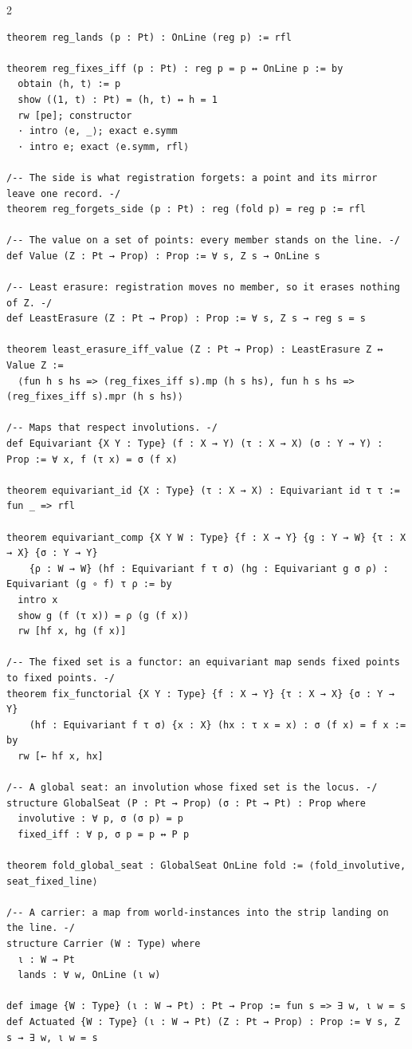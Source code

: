 \documentclass[10pt]{article}
\begin{document}
\begin{multicols}{2}
\begin{Verbatim}[fontsize=\fontsize{6.0}{6.9}\selectfont,breaklines,breakanywhere,breaksymbolleft={}]
theorem reg_lands (p : Pt) : OnLine (reg p) := rfl

theorem reg_fixes_iff (p : Pt) : reg p = p ↔ OnLine p := by
  obtain ⟨h, t⟩ := p
  show ((1, t) : Pt) = (h, t) ↔ h = 1
  rw [pe]; constructor
  · intro ⟨e, _⟩; exact e.symm
  · intro e; exact ⟨e.symm, rfl⟩

/-- The side is what registration forgets: a point and its mirror leave one record. -/
theorem reg_forgets_side (p : Pt) : reg (fold p) = reg p := rfl

/-- The value on a set of points: every member stands on the line. -/
def Value (Z : Pt → Prop) : Prop := ∀ s, Z s → OnLine s

/-- Least erasure: registration moves no member, so it erases nothing of Z. -/
def LeastErasure (Z : Pt → Prop) : Prop := ∀ s, Z s → reg s = s

theorem least_erasure_iff_value (Z : Pt → Prop) : LeastErasure Z ↔ Value Z :=
  ⟨fun h s hs => (reg_fixes_iff s).mp (h s hs), fun h s hs => (reg_fixes_iff s).mpr (h s hs)⟩

/-- Maps that respect involutions. -/
def Equivariant {X Y : Type} (f : X → Y) (τ : X → X) (σ : Y → Y) : Prop := ∀ x, f (τ x) = σ (f x)

theorem equivariant_id {X : Type} (τ : X → X) : Equivariant id τ τ := fun _ => rfl

theorem equivariant_comp {X Y W : Type} {f : X → Y} {g : Y → W} {τ : X → X} {σ : Y → Y}
    {ρ : W → W} (hf : Equivariant f τ σ) (hg : Equivariant g σ ρ) : Equivariant (g ∘ f) τ ρ := by
  intro x
  show g (f (τ x)) = ρ (g (f x))
  rw [hf x, hg (f x)]

/-- The fixed set is a functor: an equivariant map sends fixed points to fixed points. -/
theorem fix_functorial {X Y : Type} {f : X → Y} {τ : X → X} {σ : Y → Y}
    (hf : Equivariant f τ σ) {x : X} (hx : τ x = x) : σ (f x) = f x := by
  rw [← hf x, hx]

/-- A global seat: an involution whose fixed set is the locus. -/
structure GlobalSeat (P : Pt → Prop) (σ : Pt → Pt) : Prop where
  involutive : ∀ p, σ (σ p) = p
  fixed_iff : ∀ p, σ p = p ↔ P p

theorem fold_global_seat : GlobalSeat OnLine fold := ⟨fold_involutive, seat_fixed_line⟩

/-- A carrier: a map from world-instances into the strip landing on the line. -/
structure Carrier (W : Type) where
  ι : W → Pt
  lands : ∀ w, OnLine (ι w)

def image {W : Type} (ι : W → Pt) : Pt → Prop := fun s => ∃ w, ι w = s
def Actuated {W : Type} (ι : W → Pt) (Z : Pt → Prop) : Prop := ∀ s, Z s → ∃ w, ι w = s


\end{Verbatim}
\end{multicols}
\end{document}
